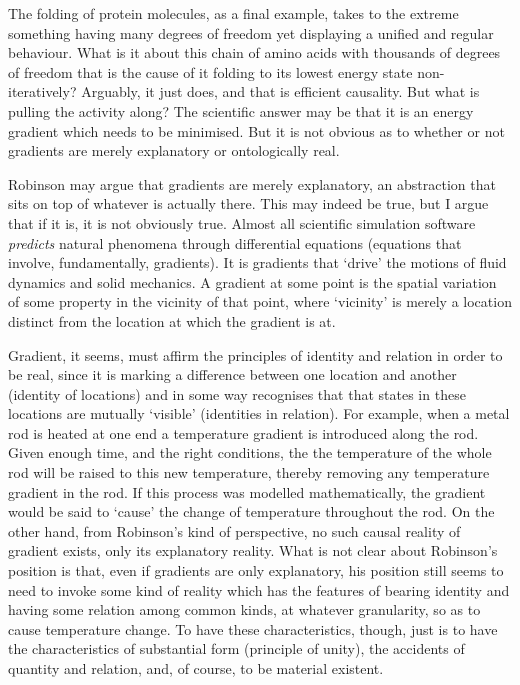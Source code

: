 The folding of protein molecules, as a final example, takes to the extreme something having many degrees of freedom yet displaying a unified and regular behaviour. What is it about this chain of amino acids with thousands of degrees of freedom that is the cause of it folding to its lowest energy state non-iteratively? Arguably, it just does, and that is efficient causality. But what is pulling the activity along? The scientific answer may be that it is an energy gradient which needs to be minimised. But it is not obvious as to whether or not gradients are merely explanatory or ontologically real.

Robinson may argue that gradients are merely explanatory, an abstraction that sits on top of whatever is actually there. This may indeed be true, but I argue that if it is, it is not obviously true. Almost all scientific simulation software \emph{predicts} natural phenomena through differential equations (equations that involve, fundamentally, gradients). It is gradients that `drive' the motions of fluid dynamics and solid mechanics. A gradient at some point is the spatial variation of some property in the vicinity of that point, where `vicinity' is merely a location distinct from the location at which the gradient is at.

Gradient, it seems, must affirm the principles of identity and relation in order to be real, since it is marking a difference between one location and another (identity of locations) and in some way recognises that that states in these locations are mutually `visible' (identities in relation).
For example, when a metal rod is heated at one end a temperature gradient is introduced along the rod. Given enough time, and the right conditions, the the temperature of the whole rod will be raised to this new temperature, thereby removing any temperature gradient in the rod. If this process was modelled mathematically, the gradient would be said to `cause' the change of temperature throughout the rod. On the other hand, from Robinson's kind of perspective, no such causal reality of gradient exists, only its explanatory reality. What is not clear about Robinson's position is that, even if gradients are only explanatory, his position still seems to need to invoke some kind of reality which has the features of bearing identity and having some relation among common kinds, at whatever granularity, so as to cause temperature change. To have these characteristics, though, just is to have the characteristics of substantial form (principle of unity), the accidents of quantity and relation, and, of course, to be material existent.

